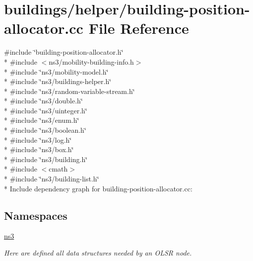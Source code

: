 \hypertarget{building-position-allocator_8cc}{}\section{buildings/helper/building-\/position-\/allocator.cc File Reference}
\label{building-position-allocator_8cc}
{\ttfamily \#include \char`\"{}building-\/position-\/allocator.\+h\char`\"{}}\\*
{\ttfamily \#include $<$ns3/mobility-\/building-\/info.\+h$>$}\\*
{\ttfamily \#include \char`\"{}ns3/mobility-\/model.\+h\char`\"{}}\\*
{\ttfamily \#include \char`\"{}ns3/buildings-\/helper.\+h\char`\"{}}\\*
{\ttfamily \#include \char`\"{}ns3/random-\/variable-\/stream.\+h\char`\"{}}\\*
{\ttfamily \#include \char`\"{}ns3/double.\+h\char`\"{}}\\*
{\ttfamily \#include \char`\"{}ns3/uinteger.\+h\char`\"{}}\\*
{\ttfamily \#include \char`\"{}ns3/enum.\+h\char`\"{}}\\*
{\ttfamily \#include \char`\"{}ns3/boolean.\+h\char`\"{}}\\*
{\ttfamily \#include \char`\"{}ns3/log.\+h\char`\"{}}\\*
{\ttfamily \#include \char`\"{}ns3/box.\+h\char`\"{}}\\*
{\ttfamily \#include \char`\"{}ns3/building.\+h\char`\"{}}\\*
{\ttfamily \#include $<$cmath$>$}\\*
{\ttfamily \#include \char`\"{}ns3/building-\/list.\+h\char`\"{}}\\*
Include dependency graph for building-\/position-\/allocator.cc\+:
\subsection*{Namespaces}
\begin{DoxyCompactItemize}
\item 
 \hyperlink{namespacens3}{ns3}
\begin{DoxyCompactList}\small\item\em Here are defined all data structures needed by an O\+L\+SR node. \end{DoxyCompactList}\end{DoxyCompactItemize}
